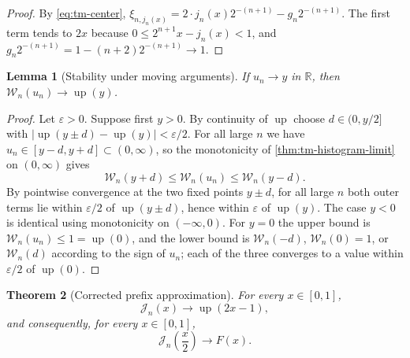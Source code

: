 \documentclass[11pt,oneside]{article}
\newtheorem{theorem}{Theorem}[section]
\newtheorem{lemma}[theorem]{Lemma}
\theoremstyle{definition}
\theoremstyle{remark}
\newcommand{\R}{\mathbb R}
\newcommand{\Up}{\operatorname{up}}
\begin{document}
\begin{proof}
By \eqref{eq:tm-center},
$\xi_{n,j_n(x)}=2\cdot j_n(x)2^{-(n+1)}-g_n2^{-(n+1)}$.  The first term tends to
$2x$ because $0\le2^{n+1}x-j_n(x)<1$, and
$g_n2^{-(n+1)}=1-(n+2)2^{-(n+1)}\to1$.
\end{proof}

\begin{lemma}[Stability under moving arguments]
\label{thm:tm-moving}
If $u_n\to y$ in $\R$, then $\mathcal W_n(u_n)\to\Up(y)$.
\end{lemma}

\begin{proof}
Let $\varepsilon>0$.  Suppose first $y>0$.  By continuity of $\Up$ choose
$d\in(0,y/2]$ with $|\Up(y\pm d)-\Up(y)|<\varepsilon/2$.  For all large $n$ we have
$u_n\in[y-d,y+d]\subset(0,\infty)$, so the monotonicity of \cref{thm:tm-histogram-limit} on
$(0,\infty)$ gives
\begin{equation*}
 \mathcal W_n(y+d)\le\mathcal W_n(u_n)\le\mathcal W_n(y-d).
\end{equation*}
By pointwise convergence at the two fixed points $y\pm d$, for all large $n$ both outer
terms lie within $\varepsilon/2$ of $\Up(y\pm d)$, hence within $\varepsilon$ of $\Up(y)$.
The case $y<0$ is identical using monotonicity on $(-\infty,0)$.  For $y=0$ the upper bound
is $\mathcal W_n(u_n)\le1=\Up(0)$, and the lower bound is $\mathcal W_n(-d)$, $\mathcal W_n(0)=1$, or
$\mathcal W_n(d)$ according to the sign of $u_n$; each of the three converges to a value within
$\varepsilon/2$ of $\Up(0)$.
\end{proof}

\begin{theorem}[Corrected prefix approximation]
\label{thm:tm-corrected-convergence}
For every $x\in[0,1]$,
\begin{equation}
 \mathcal J_n(x)\longrightarrow\Up(2x-1),                      \label{eq:tm-corrected-limit}
\end{equation}
and consequently, for every $x\in[0,1]$,
\begin{equation}
 \mathcal J_n\!\left(\frac x2\right)\longrightarrow F(x).      \label{eq:tm-corrected-fabius}
\end{equation}
\end{theorem}
\end{document}
